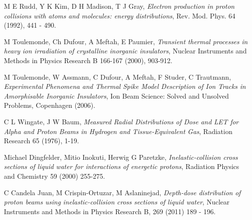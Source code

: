 \documentclass{article}
\begin{document}
\begin{multicols}{2}
\begin{thebibliography}{9}
 M E Rudd, Y K Kim, D H Madison, T J Gray, \textit{Electron production in proton collisions with atoms and molecules: energy distributions}, Rev. Mod. Phys. 64 (1992), 441 - 490.

 M Toulemonde, Ch Dufour, A Meftah, E Paumier, \textit{Transient thermal processes in heavy ion irradiation of crystalline inorganic insulators}, Nuclear Instruments and Methods in Physics Research B 166-167 (2000), 903-912.

 M Toulemonde, W Assmann, C Dufour, A Meftah, F Studer, C Trautmann, \textit{Experimental Phenomena and Thermal Spike Model Description of Ion Tracks in Amorphisable Inorganic Insulators}, Ion Beam Science: Solved and Unsolved Problems, Copenhagen (2006). 

 C L Wingate, J W Baum, \textit{Measured Radial Distributions of Dose and LET for Alpha and Proton Beams in Hydrogen and Tissue-Equivalent Gas}, Radiation Research 65 (1976), 1-19.

 Michael Dingfelder, Mitio Inokuti, Herwig G Paretzke, \textit{Inelastic-collision cross sections of liquid water for interactions of energetic protons}, Radiation Physics and Chemistry 59 (2000) 255-275. 

 C Candela Juan, M Crispin-Ortuzar, M Aslaninejad, \textit{Depth-dose distribution of proton beams using inelastic-collision cross sections of liquid water}, Nuclear Instruments and Methods in Physics Research B, 269 (2011) 189 - 196.




\end{thebibliography}



\end{multicols}
\end{document}
